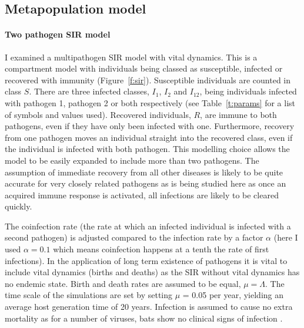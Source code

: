 \begin{table}[b!]
\label{t:params}
\end{table}




\subsection{Metapopulation model}




\paragraph{Two pathogen SIR model}

I examined a multipathogen SIR model with vital dynamics. 
This is a compartment model with individuals being classed as susceptible, infected or recovered with immunity (Figure~\ref{f:sir}).
Susceptible individuals are counted in class $S$.
There are three infected classes, $I_1$, $I_2$ and $I_{12}$, being individuals infected with pathogen 1, pathogen 2 or both respectively (see Table~\ref{t:params} for a list of symbols and values used).
Recovered individuals, $R$, are immune to both pathogens, even if they have only been infected with one.
Furthermore, recovery from one pathogen moves an individual straight into the recovered class, even if the individual is infected with both pathogen.
This modelling choice allows the model to be easily expanded to include more than two pathogens.
The assumption of immediate recovery from all other diseases is likely to be quite accurate for very closely related pathogens as is being studied here as once an acquired immune response is activated, all infections are likely to be cleared quickly. %

The coinfection rate (the rate at which an infected individual is infected with a second pathogen) is adjusted compared to the infection rate by a factor $\alpha$ (here I used $\alpha = 0.1$ which means coinfection happens at a tenth the rate of first infections).
In the application of long term existence of pathogens it is vital to include vital dynamics (births and deaths) as the SIR without vital dynamics has no endemic state.
Birth and death rates are assumed to be equal, $\mu = \Lambda$.
The time scale of the simulations are set by setting $\mu$ = 0.05 per year, yielding an average host generation time of 20 years.
Infection is assumed to cause no extra mortality as for a number of viruses, bats show no clinical signs of infection \cite{halpin2011pteropid, deThoisy2016bioecological}.


